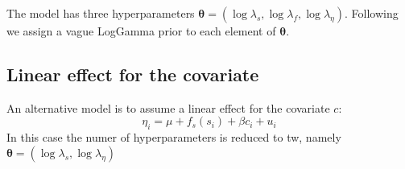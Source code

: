 \documentclass[a4paper,11pt]{article}
\def\mm#1{\ensuremath{\boldsymbol{#1}}} %
\begin{document}
    The model has three hyperparameters
    $\mm{\theta}=(\log\lambda_s,\log\lambda_f,\log\lambda_{\eta})$. Following
    \cite{tech80} we assign a vague LogGamma prior to each element of
    $\mm{\theta}$.

\subsection*{Linear effect for the covariate}
An alternative model is to assume a linear effect for the covariate $c$:
\begin{equation}\label{eq10-lin}
    \eta_i=\mu+f_s(s_i)+\beta c_i+u_i
\end{equation}
In this case the numer of hyperparameters is reduced to  tw, namely 
 $\mm{\theta}=(\log\lambda_s,\log\lambda_{\eta})$

\small \newpage
\end{document}
